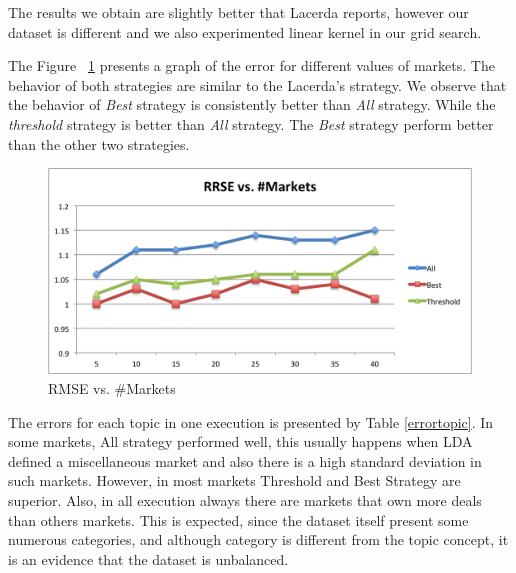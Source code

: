 \documentclass{acm_proc_article-sp}
\begin{document}
The results we obtain are slightly better that Lacerda reports, 
however our dataset is different and we also experimented 
linear kernel in our grid search. 

The Figure ~\ref{rmsemarkets} presents a graph of the error 
for different values of markets. The behavior of 
both strategies are similar to the Lacerda's strategy. We observe that 
the behavior of \emph{Best} strategy is consistently better 
than \emph{All} strategy. While the \emph{threshold} strategy is better 
than \emph{All} strategy. The \emph{Best} strategy perform better than 
the other two strategies.

\begin{figure}[H]
    \centering
    \includegraphics[scale=0.5]{rrsemarkets.png}
    \caption{RMSE vs. \#Markets}
    \label{rmsemarkets}
\end{figure}


The errors for each topic in one execution 
is presented by Table \ref{errortopic}. In some markets, 
All strategy performed well, this usually happens when 
LDA defined a miscellaneous market and also there is a 
high standard deviation in such markets. However, 
in most markets Threshold and Best Strategy are superior.
Also, in all execution always there are markets that own 
more deals than others markets. This is expected, since 
the dataset itself present some numerous categories, and 
although category is different from the topic concept, 
it is an evidence that the dataset is unbalanced.
\end{document}

